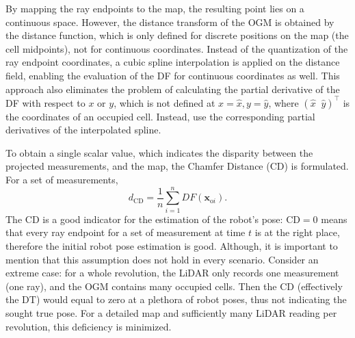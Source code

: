 By mapping the ray endpoints to the map, the resulting point lies
on a continuous space.
However, the distance transform of the OGM is obtained by
the distance function, which is only defined for discrete positions
on the map (the cell midpoints), not for continuous coordinates.
Instead of the quantization of the ray endpoint coordinates, a cubic spline
interpolation is applied on the distance field,
enabling the evaluation of the DF for continuous coordinates as well.
This approach also eliminates the problem of calculating the
partial derivative of the DF with respect to $x$ or $y$,
which is not defined at $x = \hat{x}, y = \hat{y}$, where
$(\hat{x}\;\; \hat{y})^{\top}$ is the coordinates of an occupied cell.
Instead, use the corresponding partial derivatives of the interpolated spline.


To obtain a single scalar value, which indicates the disparity between the projected measurements,
and the map, the Chamfer Distance (CD) is formulated. For a set of measurements,
\begin{equation}
    d_{\text{CD}} = \frac{1}{n}\sum_{i=1}^nDF(\mathbf{x}_{\text{o}i}).
\end{equation}
The CD is a good indicator for the estimation of the robot's pose: $\mathrm{CD}=0$ means
that every ray endpoint for a set of measurement at time $t$ is at the right place,
therefore the initial robot pose estimation is good.
Although, it is important to mention that this assumption does not hold in every
scenario. Consider an extreme case: for a whole revolution, the LiDAR only records
one measurement (one ray), and the OGM contains many occupied cells.
Then the CD (effectively the DT) would equal to zero at a plethora of robot poses, thus not indicating the sought true pose.
For a detailed map and sufficiently many LiDAR reading per revolution, this deficiency is minimized.

